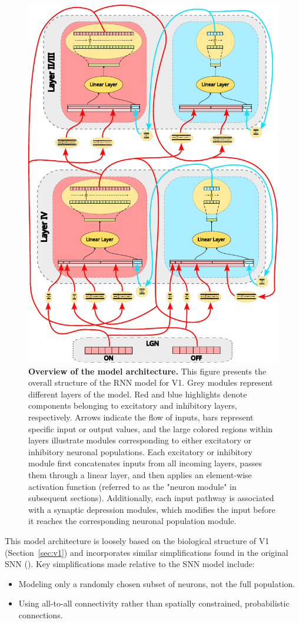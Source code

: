 \begin{figure}
    \centering
    \includegraphics[width=0.75\linewidth]{img/model_architecture.pdf}
    \caption{\textbf{Overview of the model architecture.} This figure presents the overall structure of the RNN model for V1. Grey modules represent different layers of the model. Red and blue highlights denote components belonging to excitatory and inhibitory layers, respectively. Arrows indicate the flow of inputs, bars represent specific input or output values, and the large colored regions within layers illustrate modules corresponding to either excitatory or inhibitory neuronal populations. Each excitatory or inhibitory module first concatenates inputs from all incoming layers, passes them through a linear layer, and then applies an element-wise activation function (referred to as the "neuron module" in subsequent sections). Additionally, each input pathway is associated with a synaptic depression modules, which modifies the input before it reaches the corresponding neuronal population module.}
    \label{fig:model_architecture_overview}
\end{figure}

This model architecture is loosely based on the biological structure of V1 (Section~\ref{sec:v1}) and incorporates similar simplifications found in the original SNN (\citet{antolik2024comprehensive}). Key simplifications made relative to the SNN model include:
\begin{itemize}
    \item Modeling only a randomly chosen subset of neurons, not the full population.
    \item Using all-to-all connectivity rather than spatially constrained, probabilistic connections.
\end{itemize}

